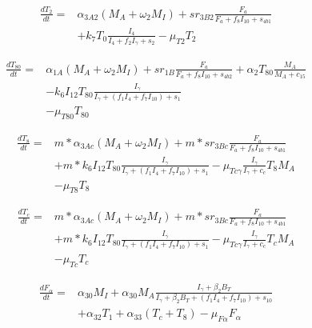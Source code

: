 \documentclass{article}
\begin{document}
	\begin{equation}
		\begin{aligned}
			\frac{dT_2}{dt} ={} & \alpha_{3A2}(M_A + \omega_2 M_I) + sr_{3B2} \frac{F_a}{F_a + f_8 I_{10} + s_{4b1}}\\
			&+ k_7 T_0 \frac{I_4}{I_4 + f_2 I_\gamma + s_2} - \mu_{T2} T_2
		\end{aligned}
	\end{equation}
	
	\begin{equation}
		\begin{aligned}
			\frac{dT_{80}}{dt} ={} & \alpha_{1A}(M_A + \omega_2 M_I) + sr_{1B} \frac{F_a}{F_a + f_8 I_{10} + s_{4b2}} + \alpha_2 T_{80} \frac{M_A} {M_A + c_{15}}\\
			&- k_6 I_{12} T_{80} \frac{I_\gamma}{I_\gamma + (f_1 I_4 + f_7 I_{10}) + s_1} \\
			&- \mu_{T80} T_{80}
		\end{aligned}
	\end{equation}
	
	\begin{equation}
		\begin{aligned}
			\frac{dT_8}{dt} ={} & m * \alpha_{3Ac}(M_A + \omega_2 M_I) + m * sr_{3Bc} \frac{F_a}{F_a + f_8 I_{10} + s_{4b1}}\\
			&+ m * k_6 I_{12} T_{80} \frac{I_\gamma}{I_\gamma + (f_1 I_4 + f_7 I_{10}) + s_1} -\mu_{Tc\gamma} \frac{I_\gamma}{I_\gamma +c_c} T_8 M_A\\
			& - \mu_{T8} T_8
		\end{aligned}
	\end{equation}
	
	\begin{equation}
		\begin{aligned}
			\frac{dT_c}{dt} ={} & m * \alpha_{3Ac}(M_A + \omega_2 M_I) + m * sr_{3Bc} \frac{F_a}{F_a + f_8 I_{10} + s_{4b1}}\\
			&+ m * k_6 I_{12} T_{80} \frac{I_\gamma}{I_\gamma + (f_1 I_4 + f_7 I_{10}) + s_1} -\mu_{Tc\gamma} \frac{I_\gamma}{I_\gamma +c_c} T_c M_A\\
			& - \mu_{Tc} T_c
		\end{aligned}
	\end{equation}
	
	\begin{equation}
		\begin{aligned}
			\frac{dF_\alpha}{dt} ={} & \alpha_{30} M_I + \alpha_{30} M_A \frac{I_\gamma + \beta_2 B_T}{I_\gamma + \beta_2 B_T + (f_1 I_4 + f_7 I_{10}) + s_{10}}\\
			& + \alpha_{32} T_1 + \alpha_{33} (T_c + T_8) - \mu_{F\alpha} F_\alpha
		\end{aligned}
	\end{equation}
	
\end{document}
